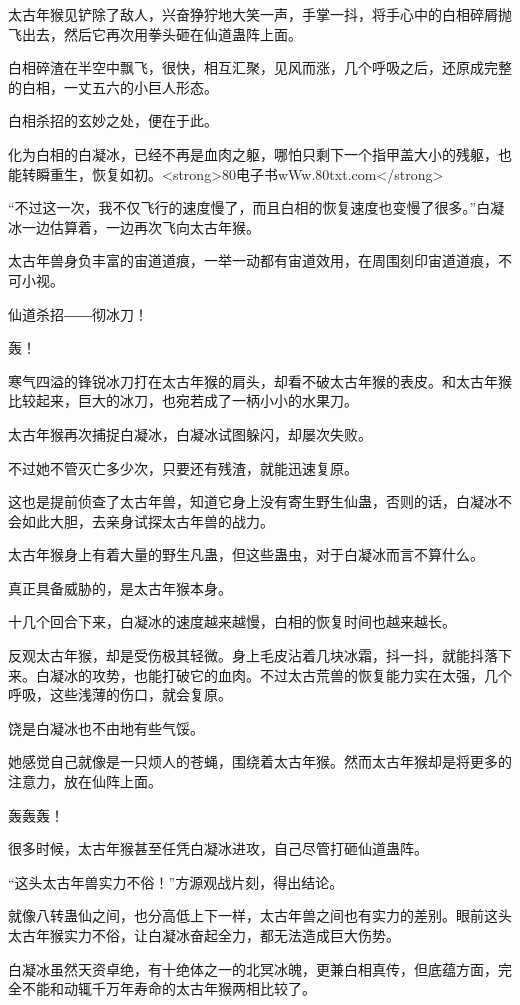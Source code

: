\begin{this_body}
太古年猴见铲除了敌人，兴奋狰狞地大笑一声，手掌一抖，将手心中的白相碎屑抛飞出去，然后它再次用拳头砸在仙道蛊阵上面。

白相碎渣在半空中飘飞，很快，相互汇聚，见风而涨，几个呼吸之后，还原成完整的白相，一丈五六的小巨人形态。

白相杀招的玄妙之处，便在于此。

化为白相的白凝冰，已经不再是血肉之躯，哪怕只剩下一个指甲盖大小的残躯，也能转瞬重生，恢复如初。<strong>80电子书wWw.80txt.com</strong>

“不过这一次，我不仅飞行的速度慢了，而且白相的恢复速度也变慢了很多。”白凝冰一边估算着，一边再次飞向太古年猴。

太古年兽身负丰富的宙道道痕，一举一动都有宙道效用，在周围刻印宙道道痕，不可小视。

仙道杀招――彻冰刀！

轰！

寒气四溢的锋锐冰刀打在太古年猴的肩头，却看不破太古年猴的表皮。和太古年猴比较起来，巨大的冰刀，也宛若成了一柄小小的水果刀。

太古年猴再次捕捉白凝冰，白凝冰试图躲闪，却屡次失败。

不过她不管灭亡多少次，只要还有残渣，就能迅速复原。

这也是提前侦查了太古年兽，知道它身上没有寄生野生仙蛊，否则的话，白凝冰不会如此大胆，去亲身试探太古年兽的战力。

太古年猴身上有着大量的野生凡蛊，但这些蛊虫，对于白凝冰而言不算什么。

真正具备威胁的，是太古年猴本身。

十几个回合下来，白凝冰的速度越来越慢，白相的恢复时间也越来越长。

反观太古年猴，却是受伤极其轻微。身上毛皮沾着几块冰霜，抖一抖，就能抖落下来。白凝冰的攻势，也能打破它的血肉。不过太古荒兽的恢复能力实在太强，几个呼吸，这些浅薄的伤口，就会复原。

饶是白凝冰也不由地有些气馁。

她感觉自己就像是一只烦人的苍蝇，围绕着太古年猴。然而太古年猴却是将更多的注意力，放在仙阵上面。

轰轰轰！

很多时候，太古年猴甚至任凭白凝冰进攻，自己尽管打砸仙道蛊阵。

“这头太古年兽实力不俗！”方源观战片刻，得出结论。

就像八转蛊仙之间，也分高低上下一样，太古年兽之间也有实力的差别。眼前这头太古年猴实力不俗，让白凝冰奋起全力，都无法造成巨大伤势。

白凝冰虽然天资卓绝，有十绝体之一的北冥冰魄，更兼白相真传，但底蕴方面，完全不能和动辄千万年寿命的太古年猴两相比较了。


\end{this_body}
